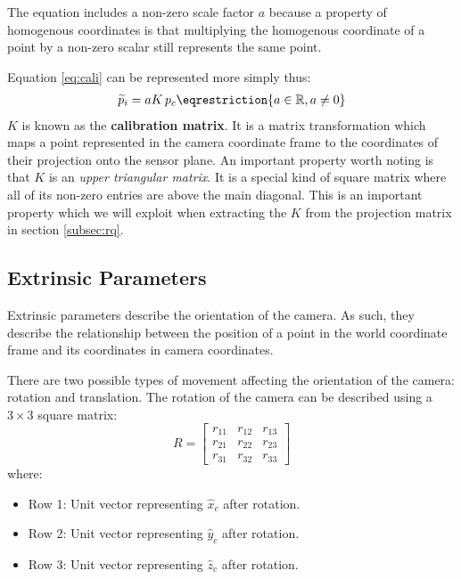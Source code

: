 The equation includes a non-zero scale factor $a$ because a property of homogenous coordinates is that multiplying the homogenous coordinate of a point by a non-zero scalar still represents the same point. 

Equation \ref{eq:cali} can be represented more simply thus:
\begin{gather}
    \widetilde{p}_i = aK\, p_c \label{eq:pi} \eqrestriction{a \in \Real, a \neq 0}
\end{gather}
$K$ is known as the \textbf{calibration matrix}. It is a matrix transformation which maps a point represented in the camera coordinate frame to the coordinates of their projection onto the sensor plane. An important property worth noting is that $K$ is an \emph{upper triangular matrix}. It is a special kind of square matrix where all of its non-zero entries are above the main diagonal. This is an important property which we will exploit when extracting the $K$ from the projection matrix in section \ref{subsec:rq}.

\subsection{Extrinsic Parameters} \label{sec:extrinsics}

Extrinsic parameters describe the orientation of the camera. As such, they describe the relationship between the position of a point in the world coordinate frame and its coordinates in camera coordinates.

There are two possible types of movement affecting the orientation of the camera: rotation and translation. The rotation of the camera can be described using a $3 \times 3$ square matrix:
\begin{equation}
    R =
    \begin{bmatrix}
        r_{11} & r_{12} & r_{13} \\
        r_{21} & r_{22} & r_{23} \\
        r_{31} & r_{32} & r_{33}
    \end{bmatrix}
\end{equation}
\noindent where:
\begin{itemize}
    \item Row 1: Unit vector representing $\hat{x}_c$ after rotation.
    \item Row 2: Unit vector representing $\hat{y}_c$ after rotation.
    \item Row 3: Unit vector representing $\hat{z}_c$ after rotation.
\end{itemize}

